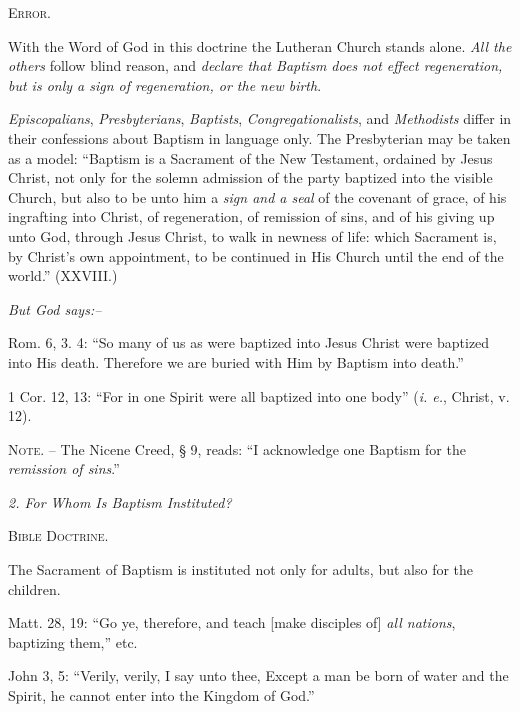\documentclass[
]{book}
\begin{document}
\begin{center}
\textsc{Error.}
\end{center}

With the Word of God in this doctrine the Lutheran Church stands alone. \emph{All the others} follow blind reason, and \emph{declare that Baptism does not effect regeneration, but is only a sign of regeneration, or the new birth}.

\emph{Episcopalians}, \emph{Presbyterians}, \emph{Baptists}, \emph{Congregationalists}, and \emph{Methodists} differ in their confessions about Baptism in language only. The Presbyterian may be taken as a model: ``Baptism is a Sacrament of the New Testament, ordained by Jesus Christ, not only for the solemn admission of the party baptized into the visible Church, but also to be unto him a \emph{sign and a seal} of the covenant of grace, of his ingrafting into Christ, of regeneration, of remission of sins, and of his giving up unto God, through Jesus Christ, to walk in newness of life: which Sacrament is, by Christ's own appointment, to be continued in His Church until the end of the world.'' (XXVIII.)

\begin{center}
\textsl{But God says:--}
\end{center}

Rom. 6, 3. 4: ``So many of us as were baptized into Jesus Christ were baptized into His death. Therefore we are buried with Him by Baptism into death.''

1 Cor. 12, 13: ``For in one Spirit were all baptized into one body'' (\emph{i. e.}, Christ, v. 12).

\textsc{Note. --} The Nicene Creed, § 9, reads: ``I acknowledge one Baptism for the \emph{remission of sins}.''

\begin{center}
\textsl{2.  For Whom Is Baptism Instituted?}

\textsc{Bible Doctrine.}
\end{center}

The Sacrament of Baptism is instituted not only for adults, but also for the children.

Matt. 28, 19: ``Go ye, therefore, and teach {[}make disciples of{]} \emph{all nations}, baptizing them,'' etc.

John 3, 5: ``Verily, verily, I say unto thee, Except a man be born of water and the Spirit, he cannot enter into the Kingdom of God.''
\end{document}

